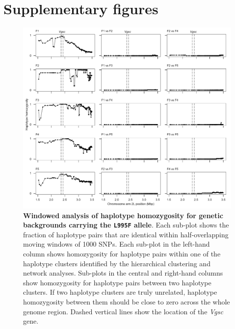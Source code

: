 \documentclass[a4paper,11pt,abstracton,hidelinks]{scrartcl}
\newcommand{\beginsupplement}{%
  \setcounter{table}{0}
  \renewcommand{\thetable}{S\arabic{table}}%
  \setcounter{figure}{0}
  \renewcommand{\thefigure}{S\arabic{figure}}%
}
\begin{document}
\beginsupplement
\section*{Supplementary figures}

\clearpage

%
\begin{figure}[!b]
  \includegraphics[width=1.1\linewidth,center]{artwork/mhh_F.pdf}
  \caption{\textbf{Windowed analysis of haplotype homozygosity for genetic backgrounds carrying the \texttt{L995F} allele}. Each sub-plot shows the fraction of haplotype pairs that are identical within half-overlapping moving windows of 1000 SNPs. Each sub-plot in the left-hand column shows homozygosity for haplotype pairs within one of the haplotype clusters identified by the hierarchical clustering and network analyses. Sub-plots in the central and right-hand columns show homozygosity for haplotype pairs between two haplotype clusters. If two haplotype clusters are truly unrelated, haplotype homozygosity between them should be close to zero across the whole genome region. Dashed vertical lines show the location of the \textit{Vgsc} gene.}
  \label{fig:mhh_f}
\end{figure}

\clearpage
\end{document}
